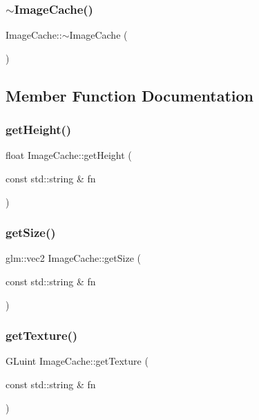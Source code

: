 \subsubsection{\texorpdfstring{$\sim$ImageCache()}{~ImageCache()}}
{\footnotesize\ttfamily Image\+Cache\+::$\sim$\+Image\+Cache (\begin{DoxyParamCaption}{ }\end{DoxyParamCaption})}



\subsection{Member Function Documentation}
\mbox{\label{classsage_1_1ImageCache_ab3fbe32a2cc379e05fb53a9883e20401}} 
\subsubsection{\texorpdfstring{getHeight()}{getHeight()}}
{\footnotesize\ttfamily float Image\+Cache\+::get\+Height (\begin{DoxyParamCaption}\item[{const std\+::string \&}]{fn }\end{DoxyParamCaption})}

\mbox{\label{classsage_1_1ImageCache_ac81e10d00d95b6d5acdffad8b54bff09}} 
\subsubsection{\texorpdfstring{getSize()}{getSize()}}
{\footnotesize\ttfamily glm\+::vec2 Image\+Cache\+::get\+Size (\begin{DoxyParamCaption}\item[{const std\+::string \&}]{fn }\end{DoxyParamCaption})}

\mbox{\label{classsage_1_1ImageCache_a36611ddea849d743f31ad68972946002}} 
\subsubsection{\texorpdfstring{getTexture()}{getTexture()}}
{\footnotesize\ttfamily G\+Luint Image\+Cache\+::get\+Texture (\begin{DoxyParamCaption}\item[{const std\+::string \&}]{fn }\end{DoxyParamCaption})}

